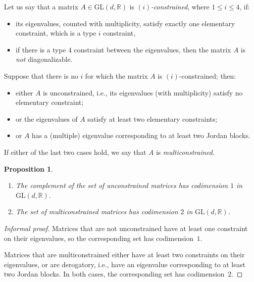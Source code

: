 \documentclass[10pt, a4paper]{amsart}
\theoremstyle{plain}
\newtheorem{prop}[lemma]{Proposition}
\theoremstyle{definition}
\theoremstyle{remark}
\theoremstyle{note}
\numberwithin{equation}{section}
\begin{document}
Let us say that a matrix $A\in {\mathrm{GL}}(d,{\mathbb{R}})$ is \emph{$(i)$-constrained}, where $1\leq i\leq 4$, if:
\begin{itemize}
	\item its eigenvalues, counted with multiplicity, satisfy exactly one elementary constraint, which is a type $i$ constraint,
	\item if there is a type $4$ constraint between the eigenvalues, then the matrix $A$ is \emph{not} diagonalizable.
\end{itemize}
Suppose that there is no $i$ for which the matrix $A$ is $(i)$-constrained; then:
\begin{itemize}
\item either $A$ is unconstrained, i.e., its eigenvalues (with multiplicity) satisfy no elementary constraint;
\item or the eigenvalues of $A$ satisfy at least two elementary constraints;
\item or $A$ has a (multiple) eigenvalue corresponding to at least two Jordan blocks.
\end{itemize}
If either of the last two cases hold, we say that $A$ is \emph{multiconstrained}.

\begin{prop}\label{p.cod_constraints}
\begin{enumerate}
\item The complement of the set of unconstrained matrices has codimension $1$ in ${\mathrm{GL}}(d,{\mathbb{R}})$.
\item The set of multiconstrained matrices has codimension $2$ in ${\mathrm{GL}}(d,{\mathbb{R}})$.
\end{enumerate}
\end{prop}

\begin{proof}[Informal proof]
Matrices that are not unconstrained have at least one constraint on their eigenvalues, so the corresponding set has codimension~$1$.

Matrices that are multiconstrained either have at least two constraints on their eigenvalues, or 
are derogatory, i.e., have an eigenvalue corresponding to at least two Jordan blocks.
In both cases, the corresponding set has codimension~$2$.
\end{proof}
\end{document}
